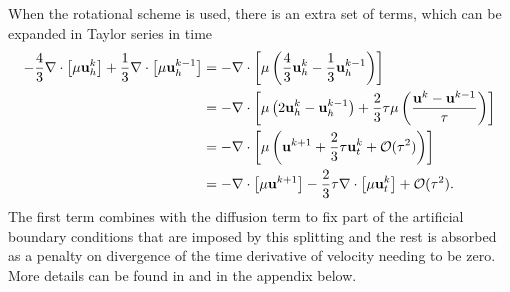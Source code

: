 \documentclass[letterpaper]{erdc}
\begin{document}
\begin{remark}
  When the rotational scheme is used, there is an extra set of terms, which can be expanded in Taylor series in time
  \begin{align}
    -\frac{4}{3}\nabla\cdot\left[\mu\textbf{u}_h^{k}\right] + \frac{1}{3}\nabla\cdot\left[\mu\textbf{u}_h^{k-1}\right] &= -\nabla\cdot\left[\mu\left(\frac{4}{3}\textbf{u}_h^{k} - \frac{1}{3}\textbf{u}_h^{k-1} \right)\right]\\
    &= -\nabla\cdot\left[\mu \left(2\textbf{u}_h^{k} - \textbf{u}_h^{k-1}  \right) + \frac{2}{3}\tau\mu\left( \frac{\textbf{u}^{k} - \textbf{u}^{k-1}}{\tau} \right)   \right]\\
    &= -\nabla\cdot\left[\mu\left( \textbf{u}^{k+1} + \frac{2}{3}\tau\textbf{u}_t^{k} + \mathcal{O}(\tau^{2}) \right)\right]\\
    &= -\nabla\cdot\left[\mu\textbf{u}^{k+1}\right] - \frac{2}{3}\tau\nabla\cdot\left[\mu\textbf{u}_t^{k}\right] + \mathcal{O}(\tau^{2}).
  \end{align}
  The first term combines with the diffusion term to fix part of the artificial boundary conditions that are imposed by this splitting and the rest is absorbed as a penalty on divergence of the time derivative of velocity needing to be zero.  More details can be found in \cite{guermond2004error} and in the appendix below.
\end{remark}

\end{document}
